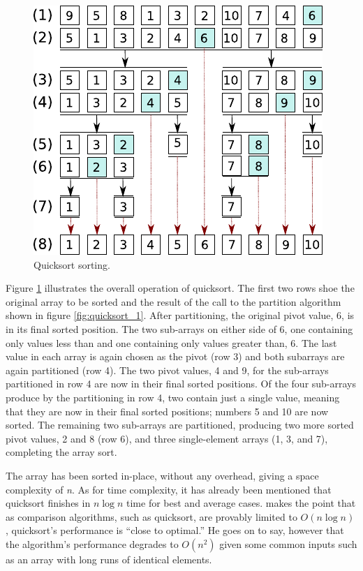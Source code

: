 \documentclass[12pt, a4paper]{article}
\begin{document}
\begin{figure}
    \centering
    \includegraphics{quicksort_2.pdf}
    \caption{\label{fig:quicksort_2}Quicksort sorting.}
\end{figure}

Figure \ref{fig:quicksort_2} illustrates the overall operation of quicksort. The first two rows shoe the original array to be sorted and the result of the call to the partition algorithm shown in figure \ref{fig:quicksort_1}. After partitioning, the original pivot value, 6, is in its final sorted position. The two sub-arrays on either side of 6, one containing only values less than and one containing only values greater than, 6. The last value in each array is again chosen as the pivot (row 3) and both subarrays are again partitioned (row 4). The two pivot values, 4 and 9, for the sub-arrays partitioned in row 4 are now in their final sorted positions. Of the four sub-arrays produce by the partitioning in row 4, two contain just a single value, meaning that they are now in their final sorted positions; numbers 5 and 10 are now sorted. The remaining two sub-arrays are partitioned, producing two more sorted pivot values, 2 and 8 (row 6), and three single-element arrays (1, 3, and 7), completing the array sort. 

The array has been sorted in-place, without any overhead, giving a space complexity of \emph{n}. As for time complexity, it has already been mentioned that quicksort finishes in $n\log n$ time for best and average cases. \textcite[119]{bentley:pearls} makes the point that as comparison algorithms, such as quicksort, are provably limited to $O(n\log n)$, quicksort's performance is ``close to optimal.''  He goes on to say, however that the algorithm's performance degrades to $O(n^{2})$ given some common inputs such as an array with long runs of identical elements.
\end{document}
